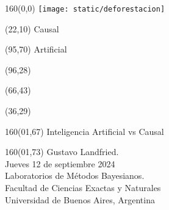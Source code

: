 \documentclass[shownotes,aspectratio=169]{beamer}
\begin{document}
\color{black!85}
\large

\begin{frame}


\begin{textblock}{160}(0,0)
\texttt{[image: static/deforestacion]}
\end{textblock}

\begin{textblock}{80}(22,10)
\textcolor{black!15}{\fontsize{44}{55}\selectfont Causal}
\end{textblock}

\begin{textblock}{47}(95,70)
\centering \textcolor{black!15}{{\fontsize{52}{65}\selectfont Artificial}}
\end{textblock}

\begin{textblock}{80}(96,28)
\LARGE  \textcolor{black!15}{}
\end{textblock}


\begin{textblock}{80}(66,43)
\LARGE  \textcolor{black!15}{\scalebox{6}{$=$}}
\end{textblock}

\begin{textblock}{80}(36,29)
\LARGE  \textcolor{black!15}{\scalebox{9}{$p$}}
\end{textblock}

 \vspace{2cm}
\maketitle



\begin{textblock}{160}(01,67)
\normalsize \textcolor{black!5}{Inteligencia Artificial vs Causal}
\end{textblock}

\begin{textblock}{160}(01,73)
\scriptsize \textcolor{black!5}{
Gustavo Landfried. \\
Jueves 12 de septiembre 2024 \\
Laboratorios de Métodos Bayesianos. \\
Facultad de Ciencias Exactas y Naturales \\
Universidad de Buenos Aires, Argentina}
\end{textblock}

\end{frame}
\end{document}
